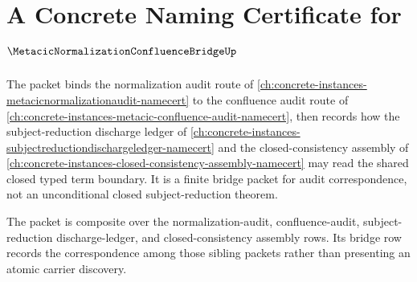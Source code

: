 \chapter{A Concrete Naming Certificate for $\MetacicNormalizationConfluenceBridgeUp$}
\label{ch:concrete-instances-metacic-normalization-confluence-bridge-namecert}

The \MetacicNormalizationConfluenceBridgeUp{} packet binds the normalization audit route of \autoref{ch:concrete-instances-metacicnormalizationaudit-namecert} to the confluence audit route of \autoref{ch:concrete-instances-metacic-confluence-audit-namecert}, then records how the subject-reduction discharge ledger of \autoref{ch:concrete-instances-subjectreductiondischargeledger-namecert} and the closed-consistency assembly of \autoref{ch:concrete-instances-closed-consistency-assembly-namecert} may read the shared closed typed term boundary. It is a finite bridge packet for audit correspondence, not an unconditional closed subject-reduction theorem.

The packet is composite over the normalization-audit, confluence-audit, subject-reduction discharge-ledger, and closed-consistency assembly rows. Its bridge row records the correspondence among those sibling packets rather than presenting an atomic carrier discovery.


